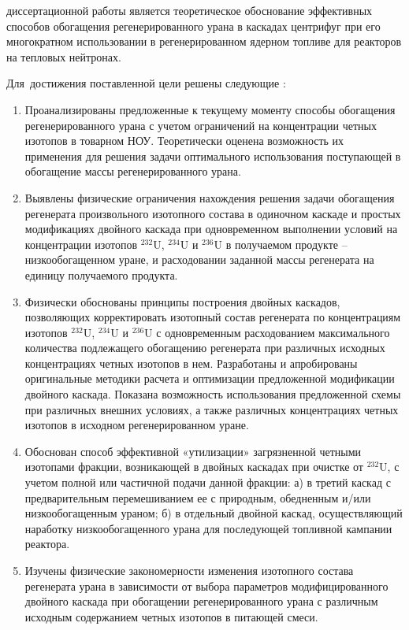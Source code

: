 {\aim} диссертационной работы является теоретическое обоснование эффективных способов обогащения регенерированного урана в каскадах центрифуг при его многократном использовании в регенерированном ядерном топливе для реакторов на тепловых нейтронах.

Для~достижения поставленной цели решены следующие {\tasks}:
\begin{enumerate}
  \item Проанализированы предложенные к текущему моменту способы обогащения регенерированного урана с учетом ограничений на концентрации четных изотопов в товарном НОУ. Теоретически оценена возможность их применения для решения задачи оптимального использования поступающей в обогащение массы регенерированного урана. 
  \item Выявлены физические ограничения нахождения решения задачи обогащения регенерата произвольного изотопного состава в одиночном каскаде и простых модификациях двойного каскада при одновременном выполнении условий на концентрации изотопов $^{232}$U, $^{234}$U и $^{236}$U в получаемом продукте -- низкообогащенном уране, и расходовании заданной массы регенерата на единицу получаемого продукта.
  \item Физически обоснованы принципы построения двойных каскадов,
  позволяющих корректировать изотопный состав регенерата по концентрациям
  изотопов $^{232}$U, $^{234}$U и $^{236}$U с одновременным расходованием максимального количества
  подлежащего обогащению регенерата при различных исходных концентрациях
  четных изотопов в нем. Разработаны и апробированы оригинальные методики расчета и оптимизации предложенной модификации двойного каскада. Показана возможность использования предложенной схемы при различных внешних условиях, а также различных концентрациях четных изотопов в исходном регенерированном уране.
  \item Обоснован способ эффективной «утилизации» загрязненной четными изотопами фракции, возникающей в двойных каскадах при очистке от $^{232}$U, с учетом полной или
  частичной подачи данной фракции: а) в третий каскад с предварительным
  перемешиванием ее с природным, обедненным и/или низкообогащенным ураном; б) в отдельный двойной каскад, осуществляющий наработку низкообогащенного урана для последующей топливной кампании реактора.
  \item Изучены физические закономерности изменения изотопного состава регенерата урана в зависимости от выбора параметров модифицированного двойного каскада при обогащении регенерированного урана с различным исходным содержанием четных изотопов в питающей смеси.
\end{enumerate}


